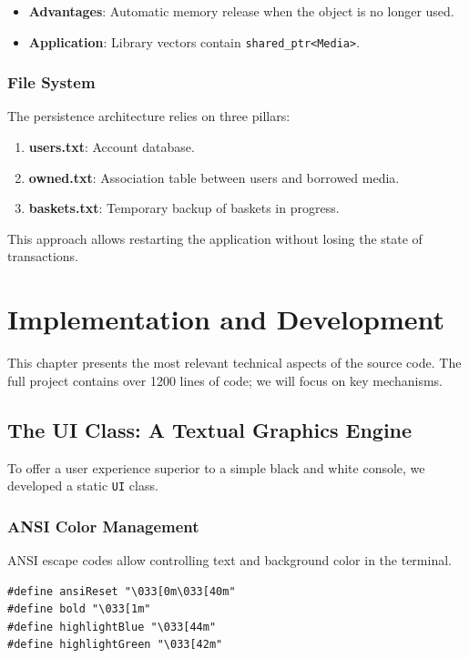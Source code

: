 \documentclass[12pt,a4paper]{report}
\begin{document}
\begin{itemize}
    \item \textbf{Advantages}: Automatic memory release when the object is no longer used.
    \item \textbf{Application}: Library vectors contain \texttt{shared\_ptr<Media>}.
\end{itemize}

\subsection{File System}
The persistence architecture relies on three pillars:
\begin{enumerate}
    \item \textbf{users.txt}: Account database.
    \item \textbf{owned.txt}: Association table between users and borrowed media.
    \item \textbf{baskets.txt}: Temporary backup of baskets in progress.
\end{enumerate}

This approach allows restarting the application without losing the state of transactions.

\chapter{Implementation and Development}

This chapter presents the most relevant technical aspects of the source code. The full project contains over 1200 lines of code; we will focus on key mechanisms.

\section{The UI Class: A Textual Graphics Engine}
To offer a user experience superior to a simple black and white console, we developed a static \texttt{UI} class.

\subsection{ANSI Color Management}
ANSI escape codes allow controlling text and background color in the terminal.
\begin{lstlisting}[caption={ANSI Color Macros Definitions}]
#define ansiReset "\033[0m\033[40m"
#define bold "\033[1m"
#define highlightBlue "\033[44m"
#define highlightGreen "\033[42m"
\end{lstlisting}
\end{document}

